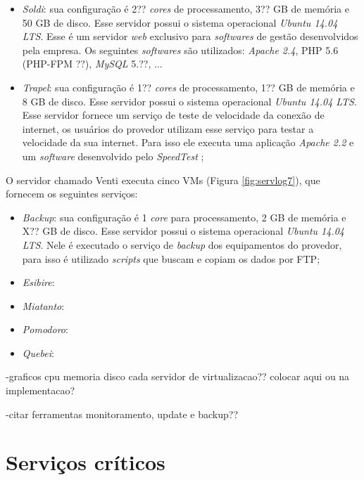 \begin{itemize}
 \item \textit{Soldi}: sua configuração é 2?? \textit{cores} de processamento, 3?? GB de memória e 50 GB de disco. Esse servidor possui o 
 sistema operacional \textit{Ubuntu 14.04 \ac{LTS}}. Esse é um servidor \textit{web} exclusivo para \textit{softwares} de gestão desenvolvidos
 pela empresa. Os seguintes \textit{softwares} são utilizados: \textit{Apache 2.4}, \ac{PHP} 5.6 (PHP-FPM ??), \textit{MySQL} 5.??, ...
 
 \item \textit{Trapel}: sua configuração é 1?? \textit{cores} de processamento, 1?? GB de memória e 8 GB de disco. Esse servidor possui o 
 sistema operacional \textit{Ubuntu 14.04 \ac{LTS}}. Esse servidor fornece um serviço de teste de velocidade da conexão de internet, os 
 usuários do provedor utilizam esse serviço para testar a velocidade da sua internet. Para isso ele executa uma aplicação \textit{Apache 2.2} 
 e um \textit{software} desenvolvido pelo \textit{SpeedTest} \cite{speedtest};
\end{itemize}

O servidor chamado Venti executa cinco \ac{VM}s (Figura \ref{fig:servlog7}), que fornecem os seguintes serviços:
\begin{itemize}
 \item \textit{Backup}: sua configuração é 1 \textit{core} para processamento, 2 GB de memória e X?? GB de disco. Esse servidor possui o 
 sistema operacional \textit{Ubuntu 14.04 \ac{LTS}}. Nele é executado o serviço de \textit{backup} dos equipamentos do provedor, para isso 
 é utilizado \textit{scripts} que buscam e copiam os dados por \ac{FTP};
 
 \item \textit{Esibire}: 
 
 \item \textit{Miatanto}: 
 
 \item \textit{Pomodoro}: 
 
 \item \textit{Quebei}: 
 
\end{itemize}

-graficos cpu memoria disco cada servidor de virtualizacao?? colocar aqui ou na implementacao?

-citar ferramentas monitoramento, update e backup??

\section{Serviços críticos}
\label{section:servcrit}

